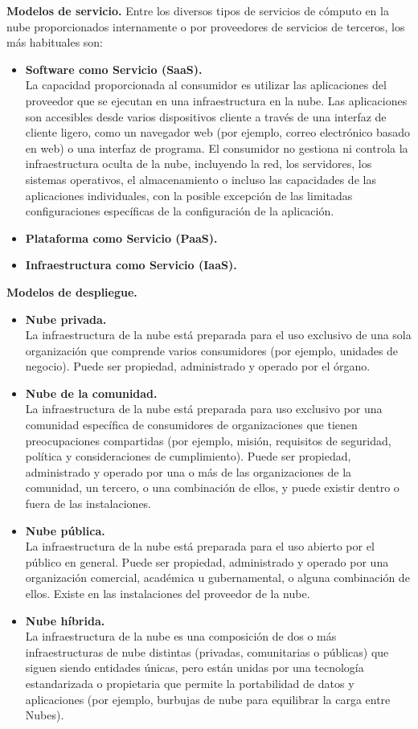 \textbf{Modelos de servicio. }
Entre los diversos tipos de servicios de cómputo en la nube proporcionados internamente o por proveedores de servicios de terceros, los más habituales son:
\begin{itemize}
\item \textbf {Software como Servicio (SaaS). } \\ La capacidad proporcionada al consumidor es utilizar las aplicaciones del proveedor que se ejecutan en una infraestructura en la nube. Las aplicaciones son accesibles desde varios dispositivos cliente a través de una interfaz de cliente ligero, como un navegador web (por ejemplo, correo electrónico basado en web) o una interfaz de programa. El consumidor no gestiona ni controla la infraestructura oculta de la nube, incluyendo la red, los servidores, los sistemas operativos, el almacenamiento o incluso las capacidades de las aplicaciones individuales, con la posible excepción de las limitadas configuraciones específicas de la configuración de la aplicación.
\item \textbf {Plataforma como Servicio (PaaS). } 
\item \textbf {Infraestructura como Servicio (IaaS). } 
\end{itemize} 


\textbf{Modelos de despliegue. }
\begin{itemize}
\item \textbf {Nube privada. } \\ La infraestructura de la nube está preparada para el uso exclusivo de una sola organización que comprende varios consumidores (por ejemplo, unidades de negocio). Puede ser propiedad, administrado y operado por el órgano.
\item \textbf{Nube de la comunidad. } \\ La infraestructura de la nube está preparada para uso exclusivo por una comunidad específica de consumidores de organizaciones que tienen preocupaciones compartidas (por ejemplo, misión, requisitos de seguridad, política y consideraciones de cumplimiento). Puede ser propiedad, administrado y operado por una o más de las organizaciones de la comunidad, un tercero, o una combinación de ellos, y puede existir dentro o fuera de las instalaciones.
\item \textbf{Nube pública. } \\ La infraestructura de la nube está preparada para el uso abierto por el público en general. Puede ser propiedad, administrado y operado por una organización comercial, académica u gubernamental, o alguna combinación de ellos. Existe en las instalaciones del proveedor de la nube.
\item \textbf{Nube híbrida. } \\ La infraestructura de la nube es una composición de dos o más infraestructuras de nube distintas (privadas, comunitarias o públicas) que siguen siendo entidades únicas, pero están unidas por una tecnología estandarizada o propietaria que permite la portabilidad de datos y aplicaciones (por ejemplo, burbujas de nube para equilibrar la carga entre Nubes).
\end{itemize} 




